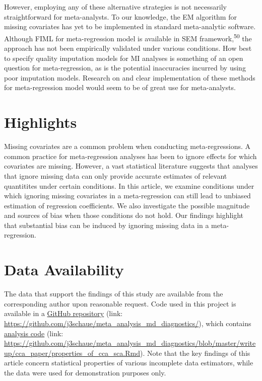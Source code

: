 \documentclass[
]{article}
\begin{document}
However, employing any of these alternative strategies is not necessarily straightforward for meta-analysts.
To our knowledge, the EM algorithm for missing covariates has yet to be implemented in standard meta-analytic software.
Although FIML for meta-regression model is available in SEM framework,\textsuperscript{50} the approach has not been empirically validated under various conditions.
How best to specify quality imputation models for MI analyses is something of an open question for meta-regression, as is the potential inaccuracies incurred by using poor imputation models.
Research on and clear implementation of these methods for meta-regression model would seem to be of great use for meta-analysts.

\clearpage

\hypertarget{highlights}{%
\section{Highlights}\label{highlights}}

Missing covariates are a common problem when conducting meta-regressions.
A common practice for meta-regression analyses has been to ignore effects for which covariates are missing.
However, a vast statistical literature suggests that analyses that ignore missing data can only provide accurate estimates of relevant quantitites under certain conditions.
In this article, we examine conditions under which ignoring missing covariates in a meta-regression can still lead to unbiased estimation of regression coefficients.
We also investigate the possible magnitude and sources of bias when those conditions do not hold.
Our findings highlight that substantial bias can be induced by ignoring missing data in a meta-regression.

\hypertarget{data-availability}{%
\section{Data Availability}\label{data-availability}}

The data that support the findings of this study are available from the corresponding author upon reasonable request. Code used in this project is available in a \href{https://github.com/j3schaue/meta_analysis_md_diagnostics/}{GitHub repository} (link: \url{https://github.com/j3schaue/meta_analysis_md_diagnostics/}), which contains \href{https://github.com/j3schaue/meta_analysis_md_diagnostics/blob/master/writeup/cca_paper/properties_of_cca_sca.Rmd}{analysis code} (link: \url{https://github.com/j3schaue/meta_analysis_md_diagnostics/blob/master/writeup/cca_paper/properties_of_cca_sca.Rmd}). Note that the key findings of this article concern statistical properties of various incomplete data estimators, while the data were used for demonstration purposes only.
\end{document}

